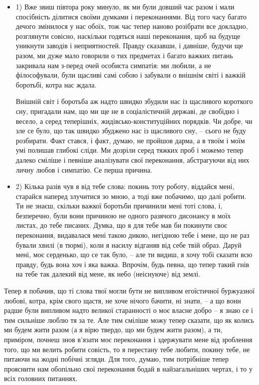 \begin{itemize}
\item 1) Вже звиш півтора року минуло, як ми були довший час разом і мали
спосібність ділитися своїми думками і переконаннями. Від того часу
багато дечого змінилося у нас обоїх, тож час тепер наново розібрати все
докладно, розглянути совісно, наскільки годяться наші переконання, щоб
на будуще уникнути заводів і неприятностей. Правду сказавши, і давніше,
будучи ще разом, ми дуже мало говорили о тих предметах і багато важких
питань закривала нам з-перед очей особиста симпатія: ми любили, а не
філософували, були щасливі самі собою і забували о внішнім світі і
важкій боротьбі, котра нас ждала.

Внішній світ і боротьба аж надто швидко збудили нас із щасливого короткого сну,
пригадали нам, що ми ще не в соціалістичній державі, де свобідно і весело, а
серед теперішніх, жидівсько-конституційних порядків. Чи добре, чи зле се було,
що так швидко збуджено нас із щасливого сну, – сього не буду розбирати. Факт
стався, і факт, думаю, не пройшов дарма, а в твоїм і моїм умі полишав глибокі
сліди. Ми дозріли серед тяжких проб і можемо тепер далеко сміліше і певніше
аналізувати свої переконання, абстрагуючи від них личну любов і симпатію. Се
перша причина.

\item 2) Кілька разів чув я від тебе слова: покинь тоту роботу, віддайся мені,
старайся наперед злучитися зо мною, а тоді вже побачимо, що далі
робити. Ти не знаєш, скільки важкої боротьби причинили мені тоті слова,
і, безперечно, були вони причиною не одного разячого дисонансу в моїх
листах, до тебе писаних. Думка, що я для тебе мав би покинути своє
переконання, видавалася мені такою дикою, негідною тебе і мене, що не
раз бували хвилі (в тюрмі), коли я насилу відганяв від себе твій образ.
Даруй мені, моє серденько, що се так було, – але ти видиш, я хочу тобі
сказати всю правду, будь вона хоч і яка важка. Впрочім, будь певна, що
тепер такий гнів на тебе так далекий від мене, як небо (неіснуюче) від
землі. 
\end{itemize}

Тепер я побачив, що ті слова твої могли бути не випливом егоїстичної
буржуазної любові, котра, крім свого щастя, не хоче нічого бачити, ні знати, –
а що вони радше були випливом надто великої старанності о моє власне добро – я
знаю се і тим сильніше люблю тя за те. Але тим сміліше можу тепер сказати, що
як колись ми будем жити разом (а я вірю твердо, що ми будем жити разом), а ти,
приміром, почнеш знов в’язати моє переконання і здержувати мене від зроблення
того, що ми велить робити совість, то я перестану тебе любити, покину тебе, не
питаючи на жодні побічні згляди. Для того, думаю, тим потрібніше тепер
прояснити нам обопільно свої переконання бодай в найзагальніших чертах, і то у
всіх головних питаннях.

